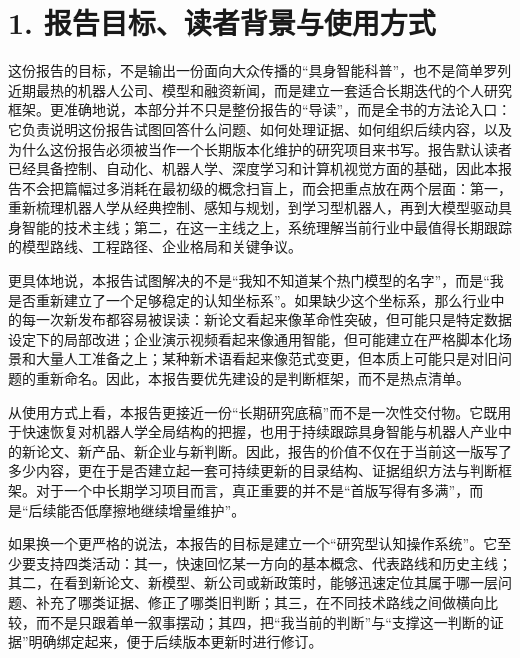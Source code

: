 

\section*{1. 报告目标、读者背景与使用方式}

这份报告的目标，不是输出一份面向大众传播的“具身智能科普”，也不是简单罗列近期最热的机器人公司、模型和融资新闻，而是建立一套适合长期迭代的个人研究框架。更准确地说，本部分并不只是整份报告的“导读”，而是全书的方法论入口：它负责说明这份报告试图回答什么问题、如何处理证据、如何组织后续内容，以及为什么这份报告必须被当作一个长期版本化维护的研究项目来书写。报告默认读者已经具备控制、自动化、机器人学、深度学习和计算机视觉方面的基础，因此本报告不会把篇幅过多消耗在最初级的概念扫盲上，而会把重点放在两个层面：第一，重新梳理机器人学从经典控制、感知与规划，到学习型机器人，再到大模型驱动具身智能的技术主线；第二，在这一主线之上，系统理解当前行业中最值得长期跟踪的模型路线、工程路径、企业格局和关键争议。

更具体地说，本报告试图解决的不是“我知不知道某个热门模型的名字”，而是“我是否重新建立了一个足够稳定的认知坐标系”。如果缺少这个坐标系，那么行业中的每一次新发布都容易被误读：新论文看起来像革命性突破，但可能只是特定数据设定下的局部改进；企业演示视频看起来像通用智能，但可能建立在严格脚本化场景和大量人工准备之上；某种新术语看起来像范式变更，但本质上可能只是对旧问题的重新命名。因此，本报告要优先建设的是判断框架，而不是热点清单。

从使用方式上看，本报告更接近一份“长期研究底稿”而不是一次性交付物。它既用于快速恢复对机器人学全局结构的把握，也用于持续跟踪具身智能与机器人产业中的新论文、新产品、新企业与新判断。因此，报告的价值不仅在于当前这一版写了多少内容，更在于是否建立起一套可持续更新的目录结构、证据组织方法与判断框架。对于一个中长期学习项目而言，真正重要的并不是“首版写得有多满”，而是“后续能否低摩擦地继续增量维护”。

如果换一个更严格的说法，本报告的目标是建立一个“研究型认知操作系统”。它至少要支持四类活动：其一，快速回忆某一方向的基本概念、代表路线和历史主线；其二，在看到新论文、新模型、新公司或新政策时，能够迅速定位其属于哪一层问题、补充了哪类证据、修正了哪类旧判断；其三，在不同技术路线之间做横向比较，而不是只跟着单一叙事摆动；其四，把“我当前的判断”与“支撑这一判断的证据”明确绑定起来，便于后续版本更新时进行修订。

